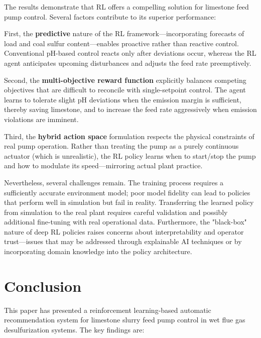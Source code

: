 \documentclass[journal]{IEEEtran}
\begin{document}
The results demonstrate that RL offers a compelling solution for limestone feed pump control. Several factors contribute to its superior performance:

First, the \textbf{predictive} nature of the RL framework---incorporating forecasts of load and coal sulfur content---enables proactive rather than reactive control. Conventional pH-based control reacts only after deviations occur, whereas the RL agent anticipates upcoming disturbances and adjusts the feed rate preemptively.

Second, the \textbf{multi-objective reward function} explicitly balances competing objectives that are difficult to reconcile with single-setpoint control. The agent learns to tolerate slight pH deviations when the emission margin is sufficient, thereby saving limestone, and to increase the feed rate aggressively when emission violations are imminent.

Third, the \textbf{hybrid action space} formulation respects the physical constraints of real pump operation. Rather than treating the pump as a purely continuous actuator (which is unrealistic), the RL policy learns when to start/stop the pump and how to modulate its speed---mirroring actual plant practice.

Nevertheless, several challenges remain. The training process requires a sufficiently accurate environment model; poor model fidelity can lead to policies that perform well in simulation but fail in reality. Transferring the learned policy from simulation to the real plant requires careful validation and possibly additional fine-tuning with real operational data. Furthermore, the "black-box" nature of deep RL policies raises concerns about interpretability and operator trust---issues that may be addressed through explainable AI techniques or by incorporating domain knowledge into the policy architecture.


\section{Conclusion}

This paper has presented a reinforcement learning-based automatic recommendation system for limestone slurry feed pump control in wet flue gas desulfurization systems. The key findings are:
\end{document}
